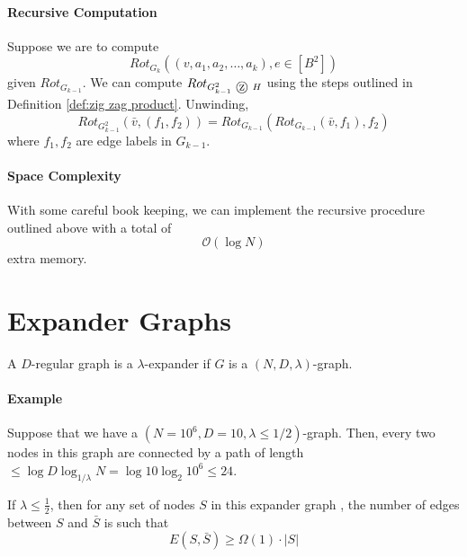 \paragraph{Recursive Computation}
Suppose we are to compute 
\begin{equation}
	Rot_{G_k}\left( (v, a_1, a_2, \dots, a_k) , e \in [B^2] \right)
\end{equation}
given $Rot_{G_{k - 1}}$. We can compute $Rot_{G^2_{k - 1} \tcircle {z} H}$ using the steps outlined in Definition \ref{def:zig zag product}. Unwinding, 
\begin{equation}
	Rot_{G^2_{k - 1}} \left( \bar v, ( f_1, f_2 ) \right) = Rot_{G_{k - 1}} \left( Rot_{G_{k - 1}} (\bar v, f_1 ) , f_2 \right)
\end{equation}
where $f_1, f_2$ are edge labels in $G_{k - 1}$. 

\paragraph{Space Complexity}
With some careful book keeping, we can implement the recursive procedure outlined above with a total of 
\begin{equation}
	\mathcal O (\log N )
\end{equation}
extra memory. 


\section{Expander Graphs}
\begin{definition}
	A $D$-regular graph is a $\lambda$-expander if $G$ is a $(N, D, \lambda)$-graph.
\end{definition}

\paragraph{Example} Suppose that we have a $(N = 10^6, D = 10, \lambda \leq 1/2 )$-graph. Then, every two nodes in this graph are connected by a path of length $\leq \log D \log_{1/\lambda} N = \log 10 \log_{2} 10^6 \leq 24$. 

\begin{proposition}
	If $\lambda \leq \frac{1}{2}$, then for any set of nodes $S$ in this expander graph , the number of edges between $S$ and $\bar S$ is such that
	\begin{equation}
		E(S, \bar S) \geq \Omega (1) \cdot |S|
	\end{equation}
\end{proposition}

